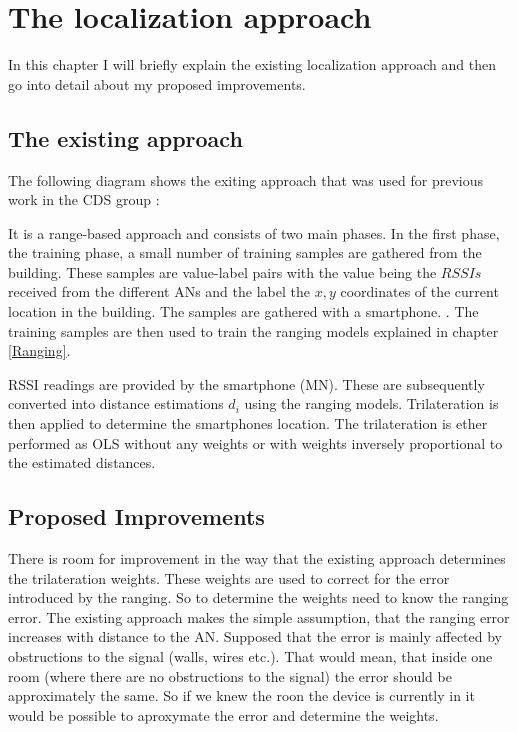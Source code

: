 \chapter{The localization approach} %

\label{Chapter3} %

In this chapter I will briefly explain the existing localization approach and then go into detail about my proposed improvements.

\section{The existing approach}

The following diagram shows the exiting approach that was used for previous work in the CDS group \cite{josePaper}:


It is a range-based approach and consists of two main phases. In the first phase, the training phase, a small number of training samples are gathered from the building. These samples are value-label pairs with the value being the \(RSSIs\) received from the different ANs and the label the \(x,y\) coordinates of the current location in the building. The samples are gathered with a smartphone. . The training samples are then used to train the ranging models explained in chapter \ref{Ranging}.

 RSSI readings are provided by the smartphone (MN). These are subsequently converted into distance estimations \(d_i\)  using the ranging models. Trilateration is then applied to determine the smartphones location. The trilateration is ether performed as OLS without any weights or with weights inversely proportional to the estimated distances.

\section{Proposed Improvements}

There is room for improvement in the way that the existing approach determines the trilateration weights. These weights are used to correct for the error introduced by the ranging. So to determine the weights  need to know the ranging error. The existing approach makes the simple assumption, that the ranging error increases with distance to the AN.  Supposed that the error is mainly affected by obstructions to the signal (walls, wires etc.). That would mean, that inside one room (where there are no obstructions to the signal) the error should be approximately the same. So if we knew the roon the device is currently in it would be possible to aproxymate the error and determine the weights.

